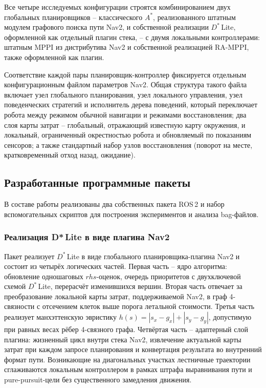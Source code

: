 \documentclass[a4paper,12pt]{extarticle}
\begin{document}
    Все четыре исследуемых конфигурации строятся комбинированием двух глобальных планировщиков -- классического $A^*$, реализованного штатным модулем графового поиска пути Nav2, и собственной реализации $D^*$\,Lite, оформленной как отдельный плагин стека, -- с двумя локальными контроллерами: штатным MPPI из дистрибутива Nav2 и собственной реализацией RA-MPPI, также оформленной как плагин.

    Соответствие каждой пары планировщик-контроллер фиксируется отдельным конфигурационным файлом параметров Nav2. Общая структура такого файла включает узел глобального планирования, узел локального управления, узел поведенческих стратегий и исполнитель дерева поведений, который переключает робота между режимом обычной навигации и режимами восстановления; два слоя карты затрат -- глобальный, отражающий известную карту окружения, и локальный, ограниченный окрестностью робота и обновляемый по показаниям сенсоров; а также стандартный набор узлов восстановления (поворот на месте, кратковременный отход назад, ожидание).

    \subsection{Разработанные программные пакеты}

    В составе работы реализованы два собственных пакета ROS\,2 и набор вспомогательных
    скриптов для построения экспериментов и анализа bag-файлов.

    \subsubsection{Реализация D*\,Lite в виде плагина Nav2}

    Пакет реализует $D^*$\,Lite в виде глобального планировщика-плагина Nav2 и состоит из четырёх логических частей. Первая часть -- ядро алгоритма: обновление одношаговых $\mathit{rhs}$-оценок, очередь приоритетов с двухключевой схемой $D^*$\,Lite, перерасчёт изменившихся вершин. Вторая часть отвечает за преобразование локальной карты затрат, поддерживаемой Nav2, в граф 4-связности с отсечением клеток выше порога летальной стоимости. Третья часть реализует манхэттенскую эвристику $h(s) = |s_x - g_x| + |s_y - g_y|$, допустимую при равных весах рёбер 4-связного графа. Четвёртая часть -- адаптерный слой плагина: жизненный цикл внутри стека Nav2, извлечение актуальной карты затрат при каждом запросе планирования и конвертация результата во внутренний формат пути. Возникающие на диагональных участках лестничные траектории сглаживаются локальным контроллером в рамках штрафа выравнивания пути и pure-pursuit-цели без существенного замедления движения.
\end{document}
